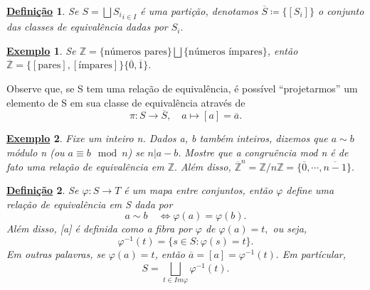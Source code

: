 \documentclass{article}
\newtheorem*{def*}{\underline{Defini\c c\~ao}}
\newtheorem{example*}{\underline{Exemplo}}
\begin{document}
\begin{def*}
  Se $S = \bigsqcup{S_{i}}_{i\in I}$ \'e uma parti\c c\~ao, denotamos $\overline{S}\coloneqq\{[S_{i}]\} $ o conjunto das classes
de equival\^encia dadas por $S_{i}.$
\end{def*}
\begin{example*}
Se $\mathbb{Z}=\{\text{n\'umeros pares}\}\bigsqcup{\{\text{n\'umeros \'impares}\}}$, ent\~ao $\overline{\mathbb{Z}} =\{[\text{pares}], [\text{\'impares}]\} 
 \{\overline{0}, \overline{1}\}.$
\end{example*}
  Observe que, se S tem uma rela\c c\~ao de equival\^encia, \'e poss\'ivel ``projetarmos'' um elemento de S em sua classe de equival\^encia atrav\'es de 
    $$
    \pi:S\rightarrow \overline{S},\quad a\mapsto[a]=\overline{a}.
    $$
 \begin{example*}
   Fixe um inteiro n. Dados a, b tamb\'em inteiros, dizemos que $a\sim b$ m\'odulo n (ou $a\equiv b\mod n$) se $n|a-b.$ Mostre que
   a congru\^encia mod n \'e de fato uma rela\c c\~ao de equival\^encia em $\mathbb{Z}.$ Al\'em disso, $\overline{\mathbb{Z}}^{n} = \mathbb{Z}/n\mathbb{Z} = \{\overline{0}, \cdots, \overline{n-1}\}.$
 \end{example*}
\begin{def*}
  Se $\varphi:S\rightarrow T$ \'e um mapa entre conjuntos, ent\~ao $\varphi$ define uma rela\c c\~ao de equival\^encia em S dada por 
    $$
      a\sim b\quad \Longleftrightarrow \varphi(a) = \varphi(b).
    $$
    Al\'em disso, [a] \'e definida como a fibra por $\varphi$ de $\varphi(a) = t,$ ou seja, 
      $$
      \varphi^{-1}(t) = \{s\in S: \varphi(s) = t\}.
      $$
      Em outras palavras, se $\varphi(a) = t$, ent\~ao $\overline{a} = [a] = \varphi^{-1}(t).$ Em part\'icular, 
        $$
          S = \bigsqcup_{t\in Im\varphi}{\varphi^{-1}(t)}.
        $$
\end{def*}
\end{document}
